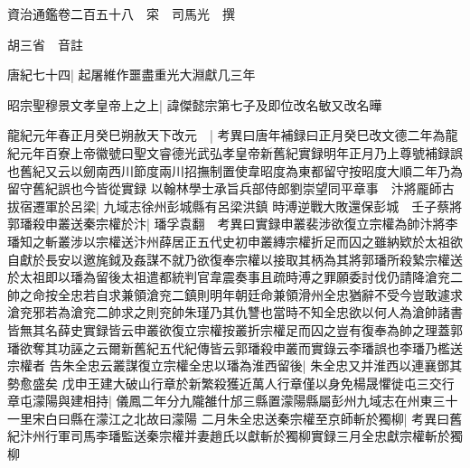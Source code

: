 資治通鑑卷二百五十八　寀　司馬光　撰

胡三省　音註

唐紀七十四|{
	起屠維作噩盡重光大淵獻几三年}


昭宗聖穆景文孝皇帝上之上|{
	諱傑懿宗第七子及即位改名敏又改名曄}


龍紀元年春正月癸巳朔赦天下改元　|{
	考異曰唐年補録曰正月癸巳改文德二年為龍紀元年百寮上帝徽號曰聖文睿德光武弘孝皇帝新舊紀實録明年正月乃上尊號補録誤也舊紀又云以劒南西川節度兩川招撫制置使韋昭度為東都留守按昭度大順二年乃為留守舊紀誤也今皆從實録}
以翰林學士承旨兵部侍郎劉崇望同平章事　汴將龎師古拔宿遷軍於呂梁|{
	九域志徐州彭城縣有呂梁洪鎮}
時溥逆戰大敗還保彭城　壬子蔡將郭璠殺申叢送秦宗權於汴|{
	璠孚袁翻　考異曰實録申叢裴涉欲復立宗權為帥汴將李璠知之斬叢涉以宗權送汴州薛居正五代史初申叢縳宗權折足而囚之雖納欵於太祖欲自獻於長安以邀旄鉞及姦謀不就乃欲復奉宗權以接取其柄為其將郭璠所殺縶宗權送於太祖即以璠為留後太祖遣都統判官韋震奏事且疏時溥之罪願委討伐仍請降滄兖二帥之命按全忠若自求兼領滄兖二鎮則明年朝廷命兼領滑州全忠猶辭不受今豈敢遽求滄兖邪若為滄兖二帥求之則兖帥朱瑾乃其仇讐也當時不知全忠欲以何人為滄帥諸書皆無其名薛史實録皆云申叢欲復立宗權按叢折宗權足而囚之豈有復奉為帥之理蓋郭璠欲奪其功誣之云爾新舊紀五代紀傳皆云郭璠殺申叢而實錄云李璠誤也李璠乃檻送宗權者}
告朱全忠云叢謀復立宗權全忠以璠為淮西留後|{
	朱全忠又并淮西以連襄鄧其勢愈盛矣}
戊申王建大破山行章於新繁殺獲近萬人行章僅以身免楊晟懼徙屯三交行章屯濛陽與建相持|{
	儀鳳二年分九隴雒什邡三縣置濛陽縣屬彭州九域志在州東三十一里宋白曰縣在濛江之北故曰濛陽}
二月朱全忠送秦宗權至京師斬於獨柳|{
	考異曰舊紀汴州行軍司馬李璠監送秦宗權并妻趙氏以獻斬於獨柳實録三月全忠獻宗權斬於獨柳}


